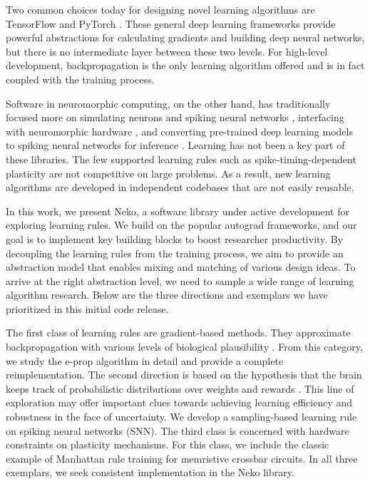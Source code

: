 \documentclass[sigconf,dvipsnames]{acmart}
\begin{document}
Two common choices today for designing novel learning algorithms are TensorFlow \cite{abadi2016tensorflow} and PyTorch \cite{paszke2019pytorch}.
These general deep learning frameworks provide powerful abstractions for calculating gradients and building deep neural networks, but there is no intermediate layer between these two levels.
For high-level development, backpropagation is the only learning algorithm offered and is in fact coupled with the training process.

Software in neuromorphic computing, on the other hand, has traditionally focused more on simulating neurons and spiking neural networks \cite{carnevale2006neuron,gewaltig2007nest,bekolay2014nengo,stimberg2019brian}, interfacing with neuromorphic hardware \cite{davison2009pynn,sawada2016truenorth,lin2018programming,rueckauer2021nxtf}, and converting pre-trained deep learning models to spiking neural networks for inference \cite{rueckauer2017conversion,rueckauer2018conversion}.
Learning has not been a key part of these libraries.
The few supported learning rules such as spike-timing-dependent plasticity are not competitive on large problems.
As a result, new learning algorithms are developed in independent codebases that are not easily reusable.

In this work, we present Neko, a software library under active development for exploring learning rules.
We build on the popular autograd frameworks, and our goal is to implement key building blocks to boost researcher productivity.
By decoupling the learning rules from the training process, we aim to provide an abstraction model that enables mixing and matching of various design ideas.
To arrive at the right abstraction level, we need to sample a wide range of learning algorithm research.
Below are the three directions and exemplars we have prioritized in this initial code release.

The first class of learning rules are gradient-based methods.
They approximate backpropagation with various levels of biological plausibility \cite{lillicrap2020backpropagation,lee2016training,sacramento2018dendritic,neftci2019surrogate,zenke2018superspike,marschall2020unified,lillicrap2016random,akrout2019deep,sornborger2019pulse}.
From this category, we study the e-prop algorithm \cite{bellec2020solution} in detail and provide a complete reimplementation.
The second direction is based on the hypothesis that the brain keeps track of probabilistic distributions over weights and rewards \cite{aitchison2021synaptic,dabney2020distributional}.
This line of exploration may offer important clues towards achieving learning efficiency and robustness in the face of uncertainty.
We develop a sampling-based learning rule on spiking neural networks (SNN).
The third class is concerned with hardware constraints on plasticity mechanisms.
For this class, we include the classic example of Manhattan rule training for memristive crossbar circuits.
In all three exemplars, we seek consistent implementation in the Neko library.
\end{document}
